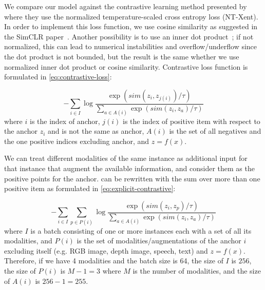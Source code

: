 \documentclass[sigconf,natbib=true,anonymous=true]{acmart}
\newcommand{\todokdinline}[1]{\todo[color=red!20,inline]{{KD: \small #1}}}
\begin{document}
We compare our model against the contrastive learning method presented by~\citet{chen2020simple} where they use the normalized
temperature-scaled cross entropy loss (NT-Xent). In order to implement this loss function, we use cosine similarity as suggested in the SimCLR paper~\citep{chen2020simple}. Another possibility is to use an inner dot product~\citep{NEURIPS2020_supervised_contrastive}; if not normalized, this can lead to numerical instabilities and overflow/underflow since the dot product is not bounded, but the result is the same whether we use normalized inner dot product or cosine similarity. Contrastive loss function is formulated in \cref{eq:contrastive-loss}:

\begin{equation}\label{eq:contrastive-loss}
    -\sum_{i \in I} \log \frac{\exp (sim(z_i , z_{j(i)}) / \tau) }{\sum_{a \in A(i)} \exp (sim(z_i, z_a) / \tau)}
\end{equation}
where $i$ is the index of anchor, $j(i)$ is the index of positive item with respect to the anchor $z_i$ and is not the same as anchor, $A(i)$ is the set of all negatives and the one positive indices excluding anchor, and $z = f(x)$.

We can treat different modalities of the same instance as additional input for that instance that augment the available information, and consider them as the positive points for the anchor.
 can be rewritten with the sum over more than one positive item as formulated in \cref{eq:explicit-contrastive}:


\begin{equation}\label{eq:explicit-contrastive}
    - \sum_{i \in I} \sum_{p \in P(i)} \log \frac{\exp (sim(z_i , z_{p})/ \tau) }{
    \sum_{a \in A(i)} \exp (sim(z_i, z_a) / \tau)}
\end{equation}
where $I$ is a batch consisting of one or more instances each with a set of all its modalities, and $P(i)$ is the set of modalities/augmentations of the anchor $i$ excluding itself (e.g. RGB image, depth image, speech, text) and $z = f(x)$. Therefore, if we have 4 modalities and the batch size is 64, the size of $I$ is $256$, the size of $P(i)$ is $M-1 = 3$ where $M$ is the number of modalities, and the size of $A(i)$ is $256 - 1 = 255$.
\end{document}
